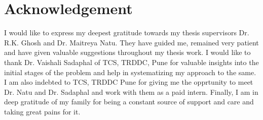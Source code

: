 \chapter*{Acknowledgement}
\thispagestyle{empty}
I would like to express my deepest gratitude towards my thesis supervisors Dr. R.K. Ghosh and Dr. Maitreya Natu. They have guided me, remained very patient and have given valuable suggestions throughout my thesis work. I would like to thank Dr. Vaishali Sadaphal of TCS, TRDDC, Pune for valuable insights into the initial stages of the problem and help in systematizing my approach to the same. I am also indebted to TCS, TRDDC Pune for giving me the opprtunity to meet Dr. Natu and Dr. Sadaphal and work with them as a paid intern. Finally, I am in deep gratitude of my family for being a constant source of support and care and taking great pains for it.
\clearpage
